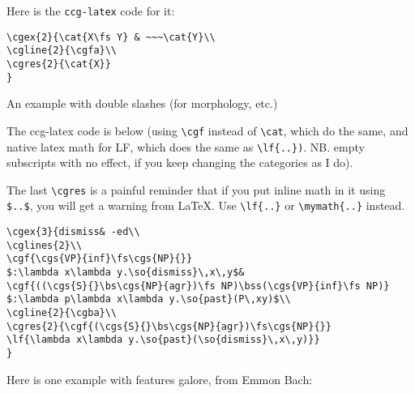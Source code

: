 \documentclass[11pt]{article}
\begin{document}
Here is the \verb|ccg-latex| code for it:
\begin{verbatim}
\cgex{2}{\cat{X\fs Y} & ~~~\cat{Y}\\
\cgline{2}{\cgfa}\\
\cgres{2}{\cat{X}}
}
\end{verbatim}
\newpage


An example with double slashes (for morphology, etc.)\bigskip

\bigskip

The ccg-latex code is below (using \verb|\cgf| instead of \verb|\cat|, which do the same, and native latex math for LF, which does the  same as \verb|\lf{..})|. NB. empty subscripts with no effect, if you keep changing the categories as I do).

The last \verb|\cgres| is a painful reminder that if you put inline math
in it using \verb|$..$|, you will get a warning from \LaTeX. Use \verb|\lf{..}| or \verb|\mymath{..}|  instead.\medskip

\begin{verbatim}
\cgex{3}{dismiss& -ed\\
\cglines{2}\\
\cgf{\cgs{VP}{inf}\fs\cgs{NP}{}}
$:\lambda x\lambda y.\so{dismiss}\,x\,y$&
\cgf{((\cgs{S}{}\bs\cgs{NP}{agr})\fs NP)\bss(\cgs{VP}{inf}\fs NP)}
$:\lambda p\lambda x\lambda y.\so{past}(P\,xy)$\\
\cgline{2}{\cgba}\\
\cgres{2}{\cgf{(\cgs{S}{}\bs\cgs{NP}{agr})\fs\cgs{NP}{}}
\lf{\lambda x\lambda y.\so{past}(\so{dismiss}\,x\,y)}}
}
\end{verbatim}
\newpage

Here is one example with features galore, from Emmon Bach:\bigskip
\end{document}
